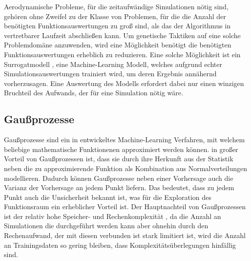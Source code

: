 Aerodynamische Probleme, für die zeitaufwändige Simulationen nötig sind, gehören ohne Zweifel zu der Klasse von Problemen, für die die Anzahl der benötigten Funktionsauswertungen zu groß sind, als das der Algorithmus in vertretbarer Laufzeit abschließen kann.
Um genetische Taktiken auf eine solche Problemdomäne anzuwenden, wird eine Möglichkeit benötigt die benötigten Funktionsauswertungen erheblich zu reduzieren.
Eine solche Möglichkeit ist ein Surrogatmodell \cite{Jin.2011}\cite{Preen.2016}, eine Machine-Learning Modell, welches aufgrund echter Simulationsauswertungen trainiert wird, um deren Ergebnis annähernd vorherzusagen.
Eine Auswertung des Modells erfordert dabei nur einen winzigen Bruchteil des Aufwands, der für eine Simulation nötig wäre.

\subsection{Gaußprozesse}


Gaußprozesse sind ein in \cite{Rasmussen.2008} entwickeltes Machine-Learning Verfahren, mit welchem beliebige mathematische Funktionenen approximiert werden können. in großer Vorteil von Gaußprozessen ist, dass sie durch ihre Herkunft aus der Statistik neben die zu approximierende Funktion als Kombination aus Normalverteilungen modellieren.
Dadurch können Gaußprozesse neben einer Vorhersage auch die Varianz der Vorhersage an jedem Punkt liefern.
Das bedeutet, dass zu jedem Punkt auch die Unsicherheit bekannt ist, was für die Exploration des Funktionsraum
ein erheblicher Vorteil ist.
Der Hauptnachteil von Gaußprozessen ist der relativ hohe Speicher- und Rechenkomplexität , da die Anzahl an Simulationen die durchgeführt werden kann aber ohnehin durch den Rechenaufwand, der mit diesen verbunden ist stark limitiert ist, wird die Anzahl an Trainingsdaten so gering bleiben, dass Komplexitätsüberlegungen hinfällig sind.

